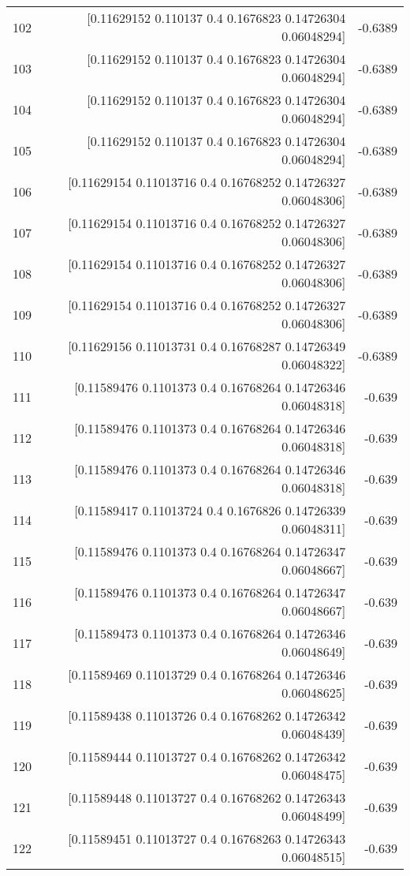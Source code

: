 \begin{longtable}{lrr}
102 & [0.11629152 0.110137   0.4        0.1676823  0.14726304 0.06048294] & -0.6389 \\
103 & [0.11629152 0.110137   0.4        0.1676823  0.14726304 0.06048294] & -0.6389 \\
104 & [0.11629152 0.110137   0.4        0.1676823  0.14726304 0.06048294] & -0.6389 \\
105 & [0.11629152 0.110137   0.4        0.1676823  0.14726304 0.06048294] & -0.6389 \\
106 & [0.11629154 0.11013716 0.4        0.16768252 0.14726327 0.06048306] & -0.6389 \\
107 & [0.11629154 0.11013716 0.4        0.16768252 0.14726327 0.06048306] & -0.6389 \\
108 & [0.11629154 0.11013716 0.4        0.16768252 0.14726327 0.06048306] & -0.6389 \\
109 & [0.11629154 0.11013716 0.4        0.16768252 0.14726327 0.06048306] & -0.6389 \\
110 & [0.11629156 0.11013731 0.4        0.16768287 0.14726349 0.06048322] & -0.6389 \\
111 & [0.11589476 0.1101373  0.4        0.16768264 0.14726346 0.06048318] & -0.639 \\
112 & [0.11589476 0.1101373  0.4        0.16768264 0.14726346 0.06048318] & -0.639 \\
113 & [0.11589476 0.1101373  0.4        0.16768264 0.14726346 0.06048318] & -0.639 \\
114 & [0.11589417 0.11013724 0.4        0.1676826  0.14726339 0.06048311] & -0.639 \\
115 & [0.11589476 0.1101373  0.4        0.16768264 0.14726347 0.06048667] & -0.639 \\
116 & [0.11589476 0.1101373  0.4        0.16768264 0.14726347 0.06048667] & -0.639 \\
117 & [0.11589473 0.1101373  0.4        0.16768264 0.14726346 0.06048649] & -0.639 \\
118 & [0.11589469 0.11013729 0.4        0.16768264 0.14726346 0.06048625] & -0.639 \\
119 & [0.11589438 0.11013726 0.4        0.16768262 0.14726342 0.06048439] & -0.639 \\
120 & [0.11589444 0.11013727 0.4        0.16768262 0.14726342 0.06048475] & -0.639 \\
121 & [0.11589448 0.11013727 0.4        0.16768262 0.14726343 0.06048499] & -0.639 \\
122 & [0.11589451 0.11013727 0.4        0.16768263 0.14726343 0.06048515] & -0.639 \\

\end{longtable}
